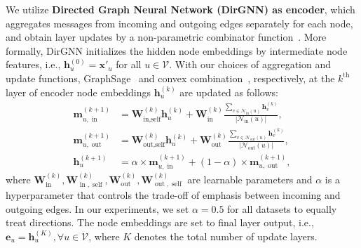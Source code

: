 \documentclass{article}
\begin{document}
We utilize \textbf{Directed Graph Neural Network (DirGNN) as encoder}, which aggregates messages from incoming and outgoing edges separately for each node, and obtain layer updates by a non-parametric combinator function~\citep{rossi2024edge}.  More formally, DirGNN initializes the hidden node embeddings by intermediate node features, i.e., $\mathbf{h}_u^{(0)}=\mathbf{x}'_u$ for all $u \in \mathcal{V}$. With our choices of aggregation and update functions, GraphSage~\citep{hamilton2017inductive} and convex combination~\citep{rossi2024edge}, respectively, at the $k^{\text{th}}$ layer of encoder node embeddings $\mathbf{h}_u^{(k)}$ are updated as follows:
    \begin{align}\label{eq:dirlp_mpnn}
        \mathbf{m}_{u, \operatorname{in}}^{(k+1)} &= \mathbf{W}^{(k)}_{\operatorname{in, self}}\mathbf{h}_u^{(k)} + \mathbf{W}^{(k)}_{\operatorname{in}} \frac{\sum_{v \in \mathcal{N}_{\operatorname{in}}(u)}\mathbf{h}_v^{(k)}}{|\mathcal{N}_{\operatorname{in}}(u)|}, \\
        \mathbf{m}_{u, \operatorname{out}}^{(k+1)} &= \mathbf{W}^{(k)}_{\operatorname{out, self}}\mathbf{h}_u^{(k)} + \mathbf{W}^{(k)}_{\operatorname{out}} \frac{\sum_{v \in \mathcal{N}_{\operatorname{out}}(u)}\mathbf{h}_v^{(k)}}{|\mathcal{N}_{\operatorname{out}}(u)|}, \\
        \mathbf{h}_{u}^{(k+1)} &= \alpha \times \mathbf{m}_{u, \operatorname{in}}^{(k+1)} + (1 - \alpha) \times \mathbf{m}_{u, \operatorname{out}}^{(k+1)},
    \end{align}
where $\mathbf{W}^{(k)}_{\operatorname{in}}, \mathbf{W}^{(k)}_{\operatorname{in}, \operatorname{self}}, \mathbf{W}^{(k)}_{\operatorname{out}}, \mathbf{W}^{(k)}_{\operatorname{out}, \operatorname{self}}$ are learnable parameters and $\alpha$ is a hyperparameter that controls the trade-off of emphasis between incoming and outgoing edges. In our experiments, we set $\alpha=0.5$ for all datasets to equally treat directions. The node embeddings are set to final layer output, i.e.,  $\mathbf{e}_u = \mathbf{h}_u^{(K)}, \forall u \in \mathcal{V}$, where $K$ denotes the total number of update layers.
\end{document}
